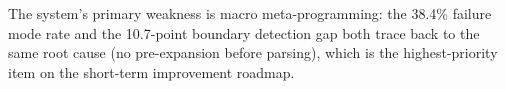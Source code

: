 The system's primary weakness is macro meta-programming: the 38.4\% failure
mode rate and the 10.7-point boundary detection gap both trace back to the same
root cause (no pre-expansion before parsing), which is the highest-priority
item on the short-term improvement roadmap.

%

